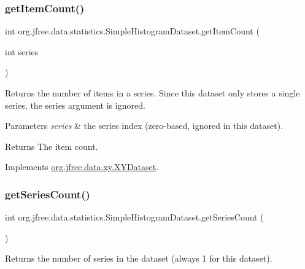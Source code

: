 \subsubsection{\texorpdfstring{get\+Item\+Count()}{getItemCount()}}
{\footnotesize\ttfamily int org.\+jfree.\+data.\+statistics.\+Simple\+Histogram\+Dataset.\+get\+Item\+Count (\begin{DoxyParamCaption}\item[{int}]{series }\end{DoxyParamCaption})}

Returns the number of items in a series. Since this dataset only stores a single series, the {\ttfamily series} argument is ignored.


\begin{DoxyParams}{Parameters}
{\em series} & the series index (zero-\/based, ignored in this dataset).\\
\hline
\end{DoxyParams}
\begin{DoxyReturn}{Returns}
The item count. 
\end{DoxyReturn}


Implements \mbox{\hyperlink{interfaceorg_1_1jfree_1_1data_1_1xy_1_1_x_y_dataset_ae81f9de91dfcae45028fc8a486a119da}{org.\+jfree.\+data.\+xy.\+X\+Y\+Dataset}}.

\mbox{\label{classorg_1_1jfree_1_1data_1_1statistics_1_1_simple_histogram_dataset_a4f4d6c0886bbc904405036f4a32d57cd}} 
\subsubsection{\texorpdfstring{get\+Series\+Count()}{getSeriesCount()}}
{\footnotesize\ttfamily int org.\+jfree.\+data.\+statistics.\+Simple\+Histogram\+Dataset.\+get\+Series\+Count (\begin{DoxyParamCaption}{ }\end{DoxyParamCaption})}

Returns the number of series in the dataset (always 1 for this dataset).

